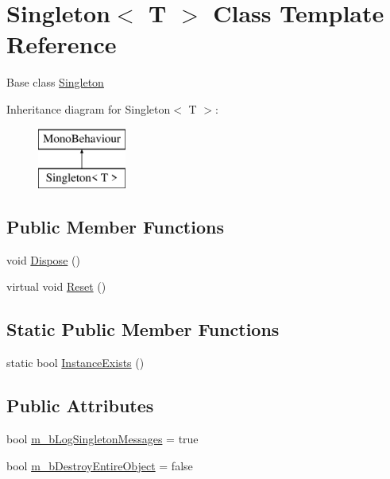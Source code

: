 \hypertarget{class_singleton}{}\section{Singleton$<$ T $>$ Class Template Reference}
\label{class_singleton}


Base class \mbox{\hyperlink{class_singleton}{Singleton}}  


Inheritance diagram for Singleton$<$ T $>$\+:\begin{figure}[H]
\begin{center}
\leavevmode
\includegraphics[height=2.000000cm]{class_singleton}
\end{center}
\end{figure}
\subsection*{Public Member Functions}
\begin{DoxyCompactItemize}
\item 
void \mbox{\hyperlink{class_singleton_a3af6527458f79b1ade7ab76b30286b6b}{Dispose}} ()
\item 
virtual void \mbox{\hyperlink{class_singleton_a35f0214fbbe0e59abe738b18a2377647}{Reset}} ()
\end{DoxyCompactItemize}
\subsection*{Static Public Member Functions}
\begin{DoxyCompactItemize}
\item 
static bool \mbox{\hyperlink{class_singleton_ae464548552a00e691241cd16b5b2fc39}{Instance\+Exists}} ()
\end{DoxyCompactItemize}
\subsection*{Public Attributes}
\begin{DoxyCompactItemize}
\item 
bool \mbox{\hyperlink{class_singleton_a7b7616e1b036d495f429f3e044bb3652}{m\+\_\+b\+Log\+Singleton\+Messages}} = true
\item 
bool \mbox{\hyperlink{class_singleton_abd3bfd9c53c4075668cf836e56b7b9c1}{m\+\_\+b\+Destroy\+Entire\+Object}} = false
\end{DoxyCompactItemize}
